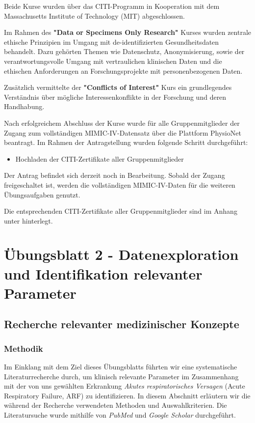 \documentclass[12pt]{article}
\begin{document}
Beide Kurse wurden über das CITI-Programm in Kooperation mit dem Massachusetts Institute of Technology (MIT) abgeschlossen.

Im Rahmen des \textbf{"Data or Specimens Only Research"} Kurses wurden zentrale ethische Prinzipien im Umgang mit de-identifizierten Gesundheitsdaten behandelt.
Dazu gehörten Themen wie Datenschutz, Anonymisierung, sowie der verantwortungsvolle Umgang mit vertraulichen klinischen Daten und die ethischen Anforderungen an Forschungsprojekte mit personenbezogenen Daten.

Zusätzlich vermittelte der \textbf{"Conflicts of Interest"} Kurs ein grundlegendes Verständnis über mögliche Interessenkonflikte in der Forschung und deren Handhabung.

Nach erfolgreichem Abschluss der Kurse wurde für alle Gruppenmitglieder der Zugang zum vollständigen MIMIC-IV-Datensatz über die Plattform PhysioNet beantragt.
Im Rahmen der Antragstellung wurden folgende Schritt durchgeführt:

\begin{itemize}
    \item Hochladen der CITI-Zertifikate aller Gruppenmitglieder

\end{itemize}

Der Antrag befindet sich derzeit noch in Bearbeitung.
Sobald der Zugang freigeschaltet ist, werden die vollständigen MIMIC-IV-Daten für die weiteren Übungsaufgaben genutzt.

Die entsprechenden CITI-Zertifikate aller Gruppenmitglieder sind im Anhang unter hinterlegt.




\section{Übungsblatt 2 - Datenexploration und Identifikation relevanter Parameter}
\subsection{Recherche relevanter medizinischer Konzepte }

\subsubsection{Methodik}
Im Einklang mit dem Ziel dieses Übungsblatts führten wir eine systematische Literaturrecherche durch, um klinisch relevante Parameter im Zusammenhang mit der von uns gewählten Erkrankung \textit{Akutes respiratorisches Versagen} (Acute Respiratory Failure, ARF) zu identifizieren. In diesem Abschnitt erläutern wir die während der Recherche verwendeten Methoden und Auswahlkriterien. Die Literatursuche wurde mithilfe von \textit{PubMed} und \textit{Google Scholar} durchgeführt.
\end{document}
